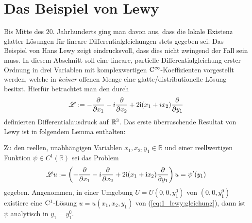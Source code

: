 

\section{Das Beispiel von Lewy}


Bis Mitte des 20. Jahrhunderts ging man davon aus, dass die lokale Existenz glatter Lösungen für lineare Differentialgleichungen stets gegeben sei. Das Beispiel von Hans Lewy zeigt eindrucksvoll, dass dies nicht zwingend der Fall sein muss.  In diesem Abschnitt soll eine lineare, partielle Differentialgleichung erster Ordnung in drei Variablen mit komplexwertigen $\mathrm C^\infty$-Koeffizienten vorgestellt werden, welche in \textit{keiner} offenen Menge eine glatte/distributionelle Lösung besitzt. Hierfür betrachtet man den durch
\begin{equation}\label{lewy:differentialausdruck}
\mathscr L := -\frac{\partial}{\partial x_1} -i\frac{\partial}{\partial x_2} +2\mathrm i(x_1+ix_2)\frac{\partial}{\partial y_1}
\end{equation}
definierten Differentialausdruck auf $\mathbb R^3$.%
Das erste überraschende Resultat von Lewy ist in folgendem Lemma enthalten:
\begin{lem}\label{thm:1_lewy}
Zu den reellen, unabhängigen Variablen $x_1,x_2,y_1\in\mathbb{R}$ und einer reellwertigen Funktion $\psi\in C^1(\mathbb{R})$ sei das Problem
\begin{equation}\label{eq:1_lewy:gleichung}
\mathscr Lu:= \left(-\frac{\partial}{\partial x_1} -i\frac{\partial}{\partial x_2} +2\mathrm i(x_1+\mathrm i x_2)\frac{\partial}{\partial y_1}\right)u=\psi'(y_1)
\end{equation}
gegeben. Angenommen, in einer Umgebung $U=U(0,0,y_1^0)$ von $(0,0,y_1^0)$ existiere eine $\mathrm C^1$-Lösung $u=u(x_1,x_2,y_1)$ von (\ref{eq:1_lewy:gleichung}), dann ist $\psi$ analytisch in $y_1=y_1^0$.
\end{lem}

